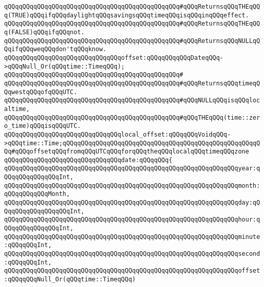 \verb|qQQqqQQqqQQqqQQqqQQqqQQqqQQqqQQqqQQqqQQqqQQqqQQq#qQQqReturnsqQQqTHEqQQq(TRUE)qQQqifqQQqdaylightqQQqsavingsqQQqtimeqQQqisqQQqinqQQqeffect.|\newline
\verb|qQQqqQQqqQQqqQQqqQQqqQQqqQQqqQQqqQQqqQQqqQQqqQQq#qQQqReturnsqQQqTHEqQQq(FALSE)qQQqifqQQqnot.|\newline
\verb|qQQqqQQqqQQqqQQqqQQqqQQqqQQqqQQqqQQqqQQqqQQqqQQq#qQQqReturnsqQQqNULLqQQqifqQQqweqQQqdon'tqQQqknow.|\newline
\newline
\verb|qQQqqQQqqQQqqQQqqQQqqQQqqQQqqQQqoffset:qQQqqQQqqQQqDateqQQq->qQQqNull_Or(qQQqtime::TimeqQQq);|\newline
\verb|qQQqqQQqqQQqqQQqqQQqqQQqqQQqqQQqqQQqqQQqqQQqqQQq#|\newline
\verb|qQQqqQQqqQQqqQQqqQQqqQQqqQQqqQQqqQQqqQQqqQQqqQQq#qQQqReturnsqQQqtimeqQQqwestqQQqofqQQqUTC.|\newline
\verb|qQQqqQQqqQQqqQQqqQQqqQQqqQQqqQQqqQQqqQQqqQQqqQQq#qQQqNULLqQQqisqQQqlocaltime,|\newline
\verb|qQQqqQQqqQQqqQQqqQQqqQQqqQQqqQQqqQQqqQQqqQQqqQQq#qQQqTHEqQQq(time::zero_time)qQQqisqQQqUTC.|\newline
\newline
\verb|qQQqqQQqqQQqqQQqqQQqqQQqqQQqqQQqlocal_offset:qQQqqQQqVoidqQQq->qQQqtime::Time;qQQqqQQqqQQqqQQqqQQqqQQqqQQqqQQqqQQqqQQqqQQqqQQqqQQqqQQq#qQQqoffsetqQQqfromqQQqUTCqQQqforqQQqtheqQQqlocalqQQqtimeqQQqzone|\newline
\newline
\newline
\verb|qQQqqQQqqQQqqQQqqQQqqQQqqQQqqQQqdate:qQQqqQQq{|\newline
\verb|qQQqqQQqqQQqqQQqqQQqqQQqqQQqqQQqqQQqqQQqqQQqqQQqqQQqqQQqqQQqqQQqyear:qQQqqQQqqQQqqQQqInt,|\newline
\verb|qQQqqQQqqQQqqQQqqQQqqQQqqQQqqQQqqQQqqQQqqQQqqQQqqQQqqQQqqQQqqQQqmonth:qQQqqQQqqQQqMonth,|\newline
\verb|qQQqqQQqqQQqqQQqqQQqqQQqqQQqqQQqqQQqqQQqqQQqqQQqqQQqqQQqqQQqqQQqday:qQQqqQQqqQQqqQQqqQQqInt,|\newline
\verb|qQQqqQQqqQQqqQQqqQQqqQQqqQQqqQQqqQQqqQQqqQQqqQQqqQQqqQQqqQQqqQQqhour:qQQqqQQqqQQqqQQqInt,|\newline
\verb|qQQqqQQqqQQqqQQqqQQqqQQqqQQqqQQqqQQqqQQqqQQqqQQqqQQqqQQqqQQqqQQqminute:qQQqqQQqInt,|\newline
\verb|qQQqqQQqqQQqqQQqqQQqqQQqqQQqqQQqqQQqqQQqqQQqqQQqqQQqqQQqqQQqqQQqsecond:qQQqqQQqInt,|\newline
\verb|qQQqqQQqqQQqqQQqqQQqqQQqqQQqqQQqqQQqqQQqqQQqqQQqqQQqqQQqqQQqqQQqoffset:qQQqqQQqNull_Or(qQQqtime::TimeqQQq)|\newline
